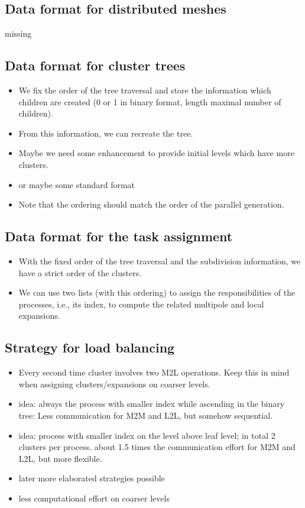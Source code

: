 \documentclass[a4paper,11pt]{article}
\theoremstyle{plain}
\theoremstyle{definition}
\theoremstyle{remark}
\begin{document}
\subsection{Data format for distributed meshes }
missing

\subsection{Data format for cluster trees}
\begin{itemize}
\item We fix the order of the tree traversal and store the information which children are
created (0 or 1 in binary format, length maximal number of children).
\item From this information, we can recreate the tree.
\item Maybe we need some enhancement to provide initial levels which have more
  clusters.
\item or maybe some standard format
\item Note that the ordering should match the order of the parallel generation.
\end{itemize}

\subsection{Data format for the  task assignment}
\begin{itemize}
\item With the fixed order of the tree traversal and the subdivision information, we
  have a strict order of the clusters.
\item We can use two lists (with this ordering) to assign the responsibilities
  of the processes, i.e., its index, to compute the related multipole and local expansions. 
\end{itemize}


\subsection{Strategy for load balancing}
\begin{itemize}
\item Every second time cluster involves two M2L operations. Keep this in mind
  when assigning clusters/expansions on coarser levels.
\item idea: always the process with smaller index while ascending in the binary
  tree: Less communication for M2M and L2L, but somehow sequential.
\item idea: process with smaller index on the level above leaf level; in total
  2 clusters per process.
  about 1.5 times the communication effort for M2M and L2L, but more flexible.
\item later more elaborated strategies possible
\item less computational effort on coarser levels
\end{itemize}
\end{document}
